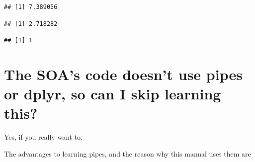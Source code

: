 \documentclass[openany]{book}
\newenvironment{Shaded}{\begin{snugshade}}{\end{snugshade}}
\newcommand{\DecValTok}[1]{\textcolor[rgb]{0.00,0.00,0.81}{#1}}
\newcommand{\KeywordTok}[1]{\textcolor[rgb]{0.13,0.29,0.53}{\textbf{#1}}}
\newcommand{\NormalTok}[1]{#1}
\newcommand{\OperatorTok}[1]{\textcolor[rgb]{0.81,0.36,0.00}{\textbf{#1}}}
\newcommand{\StringTok}[1]{\textcolor[rgb]{0.31,0.60,0.02}{#1}}
\begin{document}
\begin{verbatim}
## [1] 7.389056
\end{verbatim}

\begin{Shaded}
\end{Shaded}

\begin{verbatim}
## [1] 2.718282
\end{verbatim}

\begin{Shaded}
\end{Shaded}

\begin{verbatim}
## [1] 1
\end{verbatim}

\hypertarget{the-soas-code-doesnt-use-pipes-or-dplyr-so-can-i-skip-learning-this}{%
\section{The SOA's code doesn't use pipes or dplyr, so can I skip learning this?}\label{the-soas-code-doesnt-use-pipes-or-dplyr-so-can-i-skip-learning-this}}

Yes, if you really want to.

The advantages to learning pipes, and the reason why this manual uses them are
\end{document}
